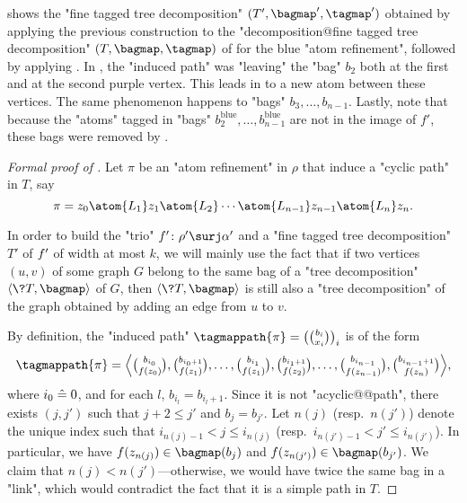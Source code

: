  shows the "fine tagged tree decomposition" $(T',\bagmap',\tagmap')$
obtained by applying the previous construction to the "decomposition@fine tagged tree decomposition"
$(T, \bagmap, \tagmap)$ of  for the blue "atom refinement",
followed by applying .
In , the "induced path" was "leaving" the "bag" $b_2$ both
at the first and at the second purple vertex. This leads in 
to a new atom between these vertices. The same phenomenon happens to "bags" $b_3, \dotsc, b_{n-1}$.
Lastly, note that because the "atoms" tagged in "bags"
$b^{\text{blue}}_2, \dotsc, b^{\text{blue}}_{n-1}$ are not in the image of $f'$,
these bags were removed by .

\begin{proof}[Formal proof of ]
    Let $\pi$ be an "atom refinement" in $\rho$ that induce a "cyclic path" in $T$,
    say
    \[
      \pi = z_0 \atom{L_1} z_1 \atom{L_2} \dotsb \atom{L_{n-1}} z_{n-1} \atom{L_n} z_n.
    \]

    In order to build the "trio" $\fun'\colon \rho' \surj \alpha'$
    and a "fine tagged tree decomposition" $T'$ of $f'$ of width at most $k$,
    we will mainly use the fact that if two vertices $(u,v)$ of some graph $G$
    belong to the same bag of a "tree decomposition" $\tup{\?T, \bagmap}$ of $G$, then
    $\tup{\?T, \bagmap}$ is still also a "tree decomposition" of the graph obtained by adding an edge from $u$ to $v$.
    
    By definition, the "induced path" $\tagmappath{\pi} = \bigl({b_i \choose x_i}\bigr)_i$
	is of the form
    \[
        \tagmappath{\pi} =
        \textstyle{
        \Bigl\langle
            {b_{i_0} \choose \fun(z_0)},
			{b_{i_0+1} \choose \fun(z_1)},
			\dotsc,
			{b_{i_1} \choose \fun(z_1)},
			{b_{i_1+1} \choose \fun(z_2)},
			\dotsc,
			{b_{i_{n-1}} \choose \fun(z_{n-1})},
			{b_{i_{n-1}+1} \choose \fun(z_n)}
        \Bigr\rangle
        },
    \]
	where $i_0 \mathrel{\hat{=}} 0$, and for each $l$, $b_{i_l} = b_{i_l+1}$.
    Since it is not "acyclic@@path", there exists $(j, j')$ such that
    $j + 2 \leq  j'$ and $b_j = b_{j'}$.
    Let $n(j)$ (resp.\ $n(j')$) denote the unique index such that
    $i_{n(j)-1} < j \leq i_{n(j)}$ (resp.\ $i_{n(j')-1} < j' \leq i_{n(j')}$).
    In particular, we have $\fun(z_{n(j)}) \in \bagmap(b_j)$
    and $\fun(z_{n(j')}) \in \bagmap(b_{j'})$.
    We claim that $n(j) < n(j')$---otherwise, we would have twice the same
	bag in a "link", which would contradict the fact that it is a simple path in $T$.
  

\end{proof}
